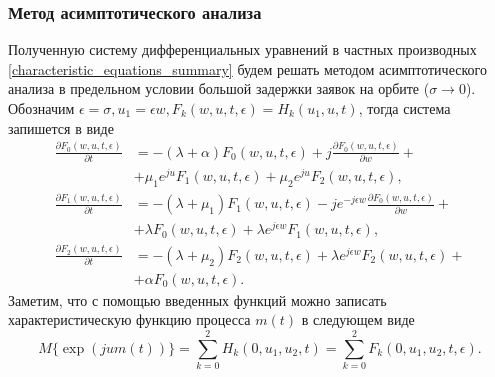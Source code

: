 \subsubsection{Метод асимптотического анализа}
Полученную систему дифференциальных уравнений в частных производных \eqref{characteristic_equations_summary} будем решать методом асимптотического анализа \cite{nazarov2017asymptotic} в предельном условии большой задержки заявок на орбите ($\sigma \rightarrow 0$).
Обозначим $\epsilon = \sigma,   u_{1}= \epsilon w,   F_{k}(w,u,t,\epsilon) = H_{k}(u_{1},u,t)$, тогда система запишется в виде
\begin{equation} \label{asymptotic_equations_summary}
	\begin{split}
		\frac{{\partial F_{0}(w,u,t,\epsilon)}}{{\partial t}} &= -(\lambda + \alpha)F_{0}(w,u,t,\epsilon) + j
		\frac{{\partial F_{0}(w,u,t,\epsilon)}}{{\partial w}} +\\  &+ \mu_{1} e^{ju}F_{1}(w,u,t,\epsilon) + \mu_{2}e^{ju}F_{2}(w,u,t,\epsilon) ,
		\\
		\frac{{\partial F_{1}(w,u,t,\epsilon)}}{{\partial t}} &= -(\lambda + \mu_{1})F_{1}(w,u,t,\epsilon) - j e^{-j\epsilon w}
		\frac{{\partial F_{0}(w,u,t,\epsilon)}}{{\partial w}} +\\  &+ \lambda F_{0}(w,u,t,\epsilon) + \lambda e^{j\epsilon w}F_{1}(w,u,t,\epsilon) ,
		\\
		\frac{{\partial F_{2}(w,u,t,\epsilon)}}{{\partial t}} &= -(\lambda + \mu_{2})F_{2}(w,u,t,\epsilon)  + \lambda e^{j\epsilon w}F_{2}(w,u,t,\epsilon) +\\  &+ \alpha F_{0}(w,u,t,\epsilon).
	\end{split}
\end{equation}  
Заметим, что с помощью введенных функций можно записать характеристическую функцию процесса $m(t)$ в следующем виде
\begin{equation*}
	M\{\exp(jum(t))\}=\sum_{k=0}^{2}H_{k}(0,u_{1},u_{2},t) = \sum_{k=0}^{2}F_{k}(0,u_{1},u_{2},t,\epsilon).
\end{equation*}

